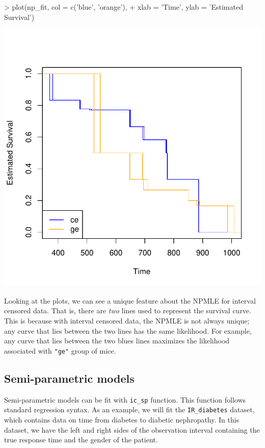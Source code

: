 \documentclass[a4paper]{article}
\begin{document}
\begin{Schunk}
\begin{Sinput}
> plot(np_fit, col = c('blue', 'orange'),
+      xlab = 'Time', ylab = 'Estimated Survival')
\end{Sinput}
\end{Schunk}
\includegraphics{icenReg-005}


Looking at the plots, we can see a unique feature about the NPMLE for interval censored data. That is, there are \emph{two} lines used to represent the survival curve. This is because with interval censored data, the NPMLE is not always unique; any curve that lies between the two lines has the same likelihood. For example, any curve that lies between the two blues lines maximizes the likelihood associated with \texttt{"ge"} group of mice. 


\subsection{Semi-parametric models}

Semi-parametric models can be fit with \texttt{ic\_sp} function. This function follows standard regression syntax. As an example, we will fit the \texttt{IR\_diabetes} dataset, which contains data on time from diabetes to diabetic nephropathy. In this dataset, we have the left and right sides of the observation interval containing the true response time and the gender of the patient. 
  
\end{document}
